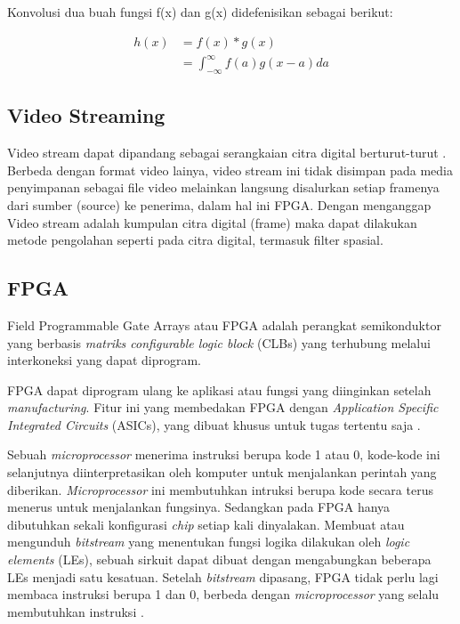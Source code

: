 Konvolusi dua buah fungsi f(x) dan g(x) didefenisikan sebagai berikut:

\begin{equation}
    \label{eq:conv}
    \begin{split}
        h(x) &= f(x)*g(x) \\
        &= \int_{-\infty}^{\infty}f(a)g(x-a) da
    \end{split}
\end{equation}


\subsection{Video Streaming}
Video stream dapat dipandang sebagai serangkaian citra digital berturut-turut . Berbeda dengan format video lainya, video stream ini tidak disimpan pada media penyimpanan sebagai file video melainkan langsung disalurkan setiap framenya dari sumber (source) ke penerima, dalam hal ini FPGA.  Dengan menganggap Video stream adalah kumpulan citra digital (frame) maka dapat dilakukan metode pengolahan seperti pada citra digital, termasuk filter spasial. 

\subsection{FPGA}
Field Programmable Gate Arrays atau FPGA adalah perangkat semikonduktor yang berbasis \textit{matriks configurable logic block} (CLBs) yang terhubung melalui interkoneksi yang dapat diprogram.

FPGA dapat diprogram ulang ke aplikasi atau fungsi yang diinginkan setelah \textit{manufacturing}. Fitur ini yang membedakan FPGA dengan \textit{Application Specific Integrated Circuits} (ASICs), yang dibuat khusus untuk tugas tertentu saja .

Sebuah \textit{microprocessor} menerima instruksi berupa kode 1 atau 0, kode-kode ini selanjutnya diinterpretasikan oleh komputer untuk menjalankan perintah yang diberikan. \textit{Microprocessor} ini membutuhkan intruksi berupa kode secara terus menerus untuk menjalankan fungsinya. Sedangkan pada FPGA hanya dibutuhkan sekali konfigurasi \textit{chip} setiap kali dinyalakan. Membuat atau mengunduh \textit{bitstream} yang menentukan fungsi logika dilakukan oleh \textit{logic elements} (LEs), sebuah sirkuit dapat dibuat dengan mengabungkan beberapa LEs menjadi satu kesatuan. Setelah \textit{bitstream} dipasang, FPGA tidak perlu lagi membaca instruksi berupa 1 dan 0, berbeda dengan \textit{microprocessor} yang selalu membutuhkan instruksi .

